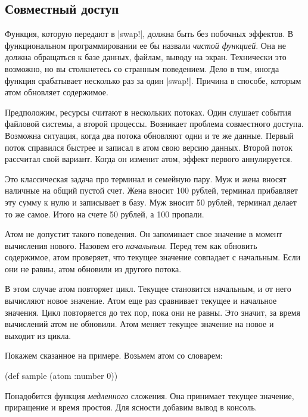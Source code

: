 \subsection{Совместный доступ}

Функция, которую передают в \spverb|swap!|, должна быть без побочных эффектов. В
функциональном программировании ее бы назвали \emph{чистой функцией}. Она не
должна обращаться к базе данных, файлам, выводу на экран. Технически это
возможно, но вы столкнетесь со странным поведением. Дело в том, иногда функция
срабатывает несколько раз за один \spverb|swap!|. Причина в способе, которым
атом обновляет содержимое.

Предположим, ресурсы считают в нескольких потоках. Один слушает события файловой
системы, а второй процессы. Возникает проблема совместного доступа. Возможна
ситуация, когда два потока обновляют одни и те же данные. Первый поток справился
быстрее и записал в атом свою версию данных. Второй поток рассчитал свой
вариант. Когда он изменит атом, эффект первого аннулируется.

Это классическая задача про терминал и семейную пару. Муж и жена вносят наличные
на общий пустой счет. Жена вносит 100 рублей, терминал прибавляет эту сумму к
нулю и записывает в базу. Муж вносит 50 рублей, терминал делает то же
самое. Итого на счете 50 рублей, а 100 пропали.

Атом не допустит такого поведения. Он запоминает свое значение в момент
вычисления нового. Назовем его \emph{начальным}. Перед тем как обновить
содержимое, атом проверяет, что текущее значение совпадает с начальным. Если они
не равны, атом обновили из другого потока.

В этом случае атом повторяет цикл. Текущее становится начальным, и от него
вычисляют новое значение. Атом еще раз сравнивает текущее и начальное
значения. Цикл повторяется до тех пор, пока они не равны. Это значит, за время
вычислений атом не обновили. Атом меняет текущее значение на новое и выходит из
цикла.

Покажем сказанное на примере. Возьмем атом со словарем:

\begin{english}
  \begin{clojure}
(def sample (atom {:number 0}))
  \end{clojure}
\end{english}

Понадобится функция \emph{медленного} сложения. Она принимает текущее значение,
приращение и время простоя. Для ясности добавим вывод в консоль.

